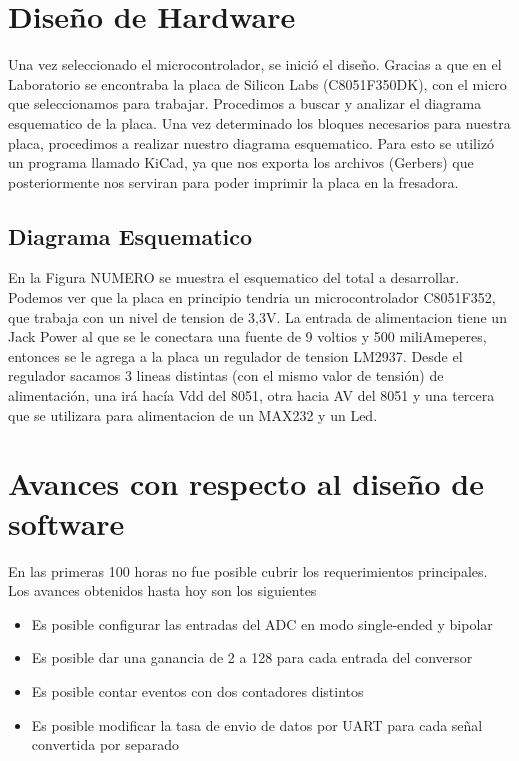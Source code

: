 \section{Dise\~no de Hardware}
Una vez seleccionado el microcontrolador, se inici\'o el dise\~no. Gracias a que en el Laboratorio se encontraba la placa de Silicon Labs (C8051F350DK), con el micro que seleccionamos para trabajar. Procedimos a buscar y analizar el diagrama esquematico de la placa.
Una vez determinado los bloques necesarios para nuestra placa, procedimos a realizar nuestro diagrama esquematico. Para esto se utiliz\'o un programa llamado KiCad, ya que nos exporta los archivos (Gerbers) que posteriormente nos serviran para poder imprimir la placa en la fresadora. 
\subsection{Diagrama Esquematico}
En la Figura NUMERO se muestra el esquematico del total a desarrollar. Podemos ver que la placa en principio tendria un microcontrolador C8051F352, que trabaja con un nivel de tension de 3,3V. La entrada de alimentacion tiene un Jack Power al que se le conectara una fuente de 9 voltios y 500 miliAmeperes, entonces se le agrega a la placa un regulador de tension LM2937. Desde el regulador sacamos 3 lineas distintas (con el mismo valor de tensi\'on) de alimentaci\'on, una ir\'a hacía Vdd del 8051, otra hacia AV del 8051 y una tercera que se utilizara para alimentacion de un MAX232 y un Led. 

\section{Avances con respecto al dise\~no de software}
En las primeras 100 horas no fue posible cubrir los requerimientos principales. Los avances obtenidos hasta hoy son los siguientes

\begin{itemize}
  \item Es posible configurar las entradas del ADC en modo single-ended y bipolar
  \item Es posible dar una ganancia de 2 a 128 para cada entrada del conversor
  \item Es posible contar eventos con dos contadores distintos
  \item Es posible modificar la tasa de envio de datos por UART para cada se\~nal convertida por separado
\end{itemize}